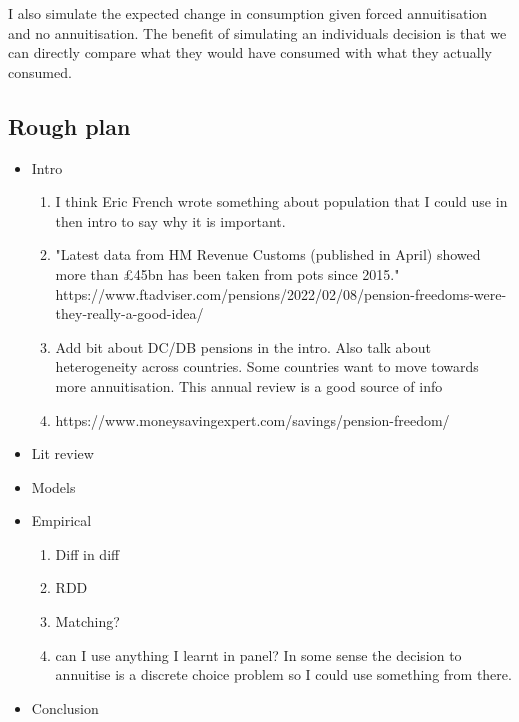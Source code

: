 \documentclass[12pt]{article}
\begin{document}
I also simulate the expected change in consumption given forced annuitisation and no annuitisation.
The benefit of simulating an individuals decision is that we can directly compare what they would have
consumed with what they actually consumed.

\subsection{Rough plan}
\begin{itemize}
    \item Intro
          \begin{enumerate}
              \item I think Eric French wrote something about population that I could use in then intro to say why it is important.
              \item "Latest data from HM Revenue Customs (published in April) showed more than £45bn has been taken from pots since 2015."
                    https://www.ftadviser.com/pensions/2022/02/08/pension-freedoms-were-they-really-a-good-idea/


              \item Add bit about DC/DB pensions in the intro. Also talk about heterogeneity across countries.
                    Some countries want to move towards more annuitisation. This annual review is a good source of info
                    \cite{banks_crawford_ar_2022}
              \item https://www.moneysavingexpert.com/savings/pension-freedom/
          \end{enumerate}
    \item Lit review
    \item Models
    \item Empirical
          \begin{enumerate}
              \item Diff in diff
              \item RDD
              \item Matching?
              \item can I use anything I learnt in panel?
                    In some sense the decision to annuitise is a discrete choice problem so I could use something from there.
          \end{enumerate}
    \item Conclusion
\end{itemize}




\end{document}
